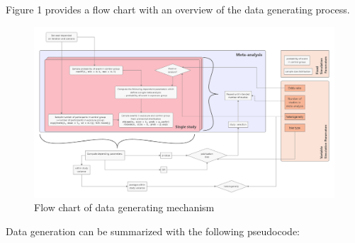 \documentclass[
  english,
  doc,floatsintext,draftall]{apa6}
\begin{document}
Figure 1 provides a flow chart with an overview of the data generating process.

\begin{figure}
\centering
\includegraphics[width=6.14583in,height=\textheight]{../figures/flow_chart.png}
\caption{Flow chart of data generating mechanism}
\end{figure}

Data generation can be summarized with the following pseudocode:
\end{document}
